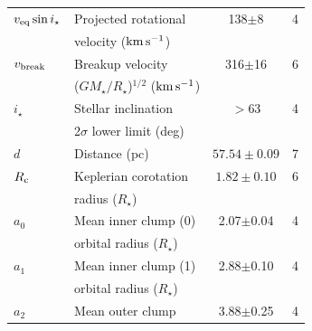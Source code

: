 \documentclass[11pt,twocolumn,tighten,linenumbers]{aastex7}
\newcommand{\kms}{\ensuremath{\rm km\,s^{-1}}}
\begin{document}
\begin{table}
\begin{tabular}{llcc}
%
$v_{\rm eq}\sin{i_\star}$\dotfill		    & Projected rotational\dotfill                                   &  138$\pm$8       & 4 \\
                                        & \hspace{3pt} velocity (\kms)	                                 &                      \\
%
$v_{\rm break}$\dotfill		              & Breakup velocity \dotfill                                      &  316$\pm$16      & 6 \\
                                        & \hspace{3pt} ($G M_\star / R_\star$)$^{1/2}$ (\kms)	           &                      \\
%
$i_\star$\dotfill                       & Stellar inclination\dotfill                                    & 	$>$63           & 4 \\
                                        & \hspace{3pt}  2$\sigma$ lower limit (deg)	                     &                      \\
%
$d$\dotfill                             & Distance (pc)\dotfill                                          & $57.54 \pm 0.09$ & 7 \\
%
$R_{\rm c}$\dotfill		                  & Keplerian corotation\dotfill                                   & $1.82 \pm 0.10$  & 6 \\
                                        & \hspace{3pt} radius ($R_\star$)	                               &                      \\
%
$a_0$\dotfill                           & Mean inner clump (0)\hspace{9pt}\dotfill           &  2.07$\pm$0.04   & 4 \\
                                        & \hspace{3pt} orbital radius ($R_\star$)	                       &                      \\
%
$a_1$\dotfill                           & Mean inner clump (1)\hspace{9pt}\dotfill           &  2.88$\pm$0.10   & 4 \\
                                        & \hspace{3pt} orbital radius ($R_\star$)	                       &                      \\
%
$a_2$\dotfill                           & Mean outer clump\hspace{9pt}\dotfill           &  3.88$\pm$0.25   & 4 \\

\end{tabular}
\end{table}
\end{document}

